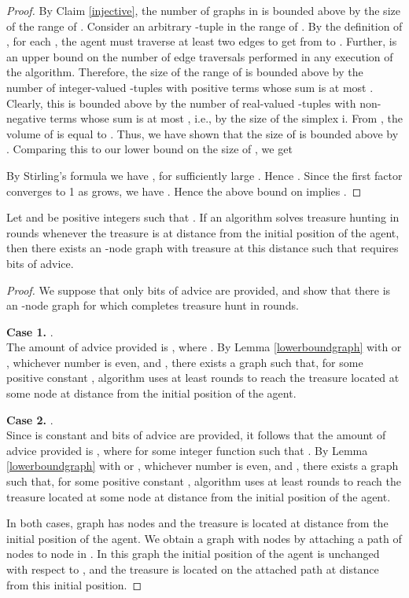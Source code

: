 \documentclass{llncs}
\begin{document}
\begin{proof}
By Claim \ref{injective}, the number of graphs in  is bounded above by the size of the range of . Consider an arbitrary -tuple  in the range of . By the definition of , for each , the agent must traverse at least two edges to get from  to . Further,  is an upper bound on the number of edge traversals performed in any execution of the algorithm. Therefore, the size of the range of  is bounded above by the number of integer-valued -tuples with positive terms whose sum is at most .  Clearly, this is bounded above by the number of real-valued -tuples with non-negative terms whose sum is at most , i.e., by the size of the simplex i. From \cite{ellis}, the volume of  is equal to . Thus, we have shown that the  size of  is bounded above by . Comparing this to our lower bound  on the size of , we get


By Stirling's formula we have , for sufficiently large . Hence .
Since the first factor converges to 1 as  grows, we have . Hence the above bound on  implies .
\end{proof}

\begin{theorem}\label{lb1}
Let  and  be positive integers such that .
 If an algorithm   solves treasure hunting in  rounds whenever the treasure is at distance  from the initial position of the agent, 
 then there exists an -node graph  with treasure at this distance such that  requires  bits of advice.
\end{theorem}
\begin{proof}
We suppose that only  bits of advice are provided, and show that there is an -node graph for which  completes treasure hunt in  rounds.

{\bf Case 1.} .\\
The amount of advice provided is , where . By Lemma \ref{lowerboundgraph} with  or , whichever number is even, and , there exists a graph  such that, for some positive constant , algorithm  uses at least  rounds to reach the treasure located at some node  at distance 
from the initial position of the agent. 

{\bf Case 2.} .\\
Since  is constant and  bits of advice are provided, it follows that
the amount of advice provided is , where  for some integer function  such that . By Lemma \ref{lowerboundgraph} with  or , whichever number is even, and , there exists a graph  such that, for some positive constant , algorithm  uses at least  rounds to reach the treasure located at some node  at distance 
from the initial position of the agent. 


In both cases, graph  has  nodes and the treasure is located at distance  from the initial position of the agent.
We obtain a graph  with  nodes by attaching a path of  nodes  to node  in . In this graph  the initial position of the agent is unchanged
with respect to , and 
the treasure is located on the attached path at distance  from this initial position. 
\end{proof}
\end{document}
